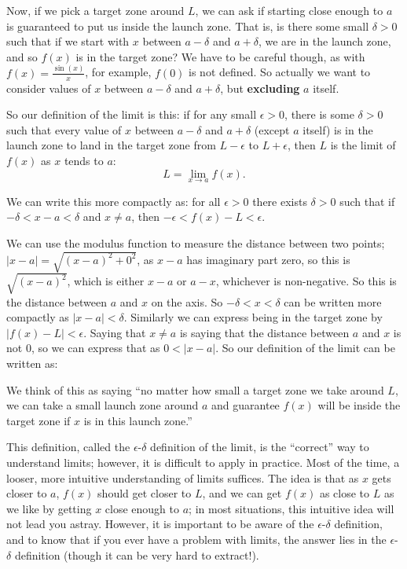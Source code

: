 \documentclass{article}
\begin{document}
Now, if we pick a target zone around $L$, we can ask if starting close enough to $a$ is guaranteed to put us inside the launch zone. That is, is there some small $\delta>0$ such that if we start with $x$ between $a-\delta$ and $a+\delta$, we are in the launch zone, and so $f(x)$ is in the target zone? We have to be careful though, as with $f(x)=\frac{\sin(x)}{x}$, for example, $f(0)$ is not defined. So actually we want to consider values of $x$ between $a-\delta$ and $a+\delta$, but \textbf{excluding} $a$ itself.

So our definition of the limit is this: if for any small $\epsilon>0$, there is some $\delta>0$ such that every value of $x$ between $a-\delta$ and $a+\delta$ (except $a$ itself) is in the launch zone to land in the target zone from $L-\epsilon$ to $L+\epsilon$, then $L$ is the limit of $f(x)$ as $x$ tends to $a$:
\[L=\lim_{x\to a}f(x).\]

We can write this more compactly as: for all $\epsilon>0$ there exists $\delta>0$ such that if $-\delta<x-a<\delta$ and $x\neq a$, then $-\epsilon<f(x)-L<\epsilon$.

We can use the modulus function to measure the distance between two points; $|x-a|=\sqrt{(x-a)^2+0^2}$, as $x-a$ has imaginary part zero, so this is $\sqrt{(x-a)^2}$, which is either $x-a$ or $a-x$, whichever is non-negative. So this is the distance between $a$ and $x$ on the axis. So $-\delta<x<\delta$ can be written more compactly as $|x-a|<\delta$. Similarly we can express being in the target zone by $|f(x)-L|<\epsilon$. Saying that $x\neq a$ is saying that the distance between $a$ and $x$ is not 0, so we can express that as $0<|x-a|$. So our definition of the limit can be written as:\bigskip

\noindent{}\bigskip

We think of this as saying ``no matter how small a target zone we take around $L$, we can take a small launch zone around $a$ and guarantee $f(x)$ will be inside the target zone if $x$ is in this launch zone.''

\vspace{5mm}


This definition, called the $\epsilon$-$\delta$ definition of the limit, is the ``correct'' way to understand limits; however, it is difficult to apply in practice. Most of the time, a looser, more intuitive understanding of limits suffices. The idea is that as $x$ gets closer to $a$, $f(x)$ should get closer to $L$, and we can get $f(x)$ as close to $L$ as we like by getting $x$ close enough to $a$; in most situations, this intuitive idea will not lead you astray. However, it is important to be aware of the $\epsilon$-$\delta$ definition, and to know that if you ever have a problem with limits, the answer lies in the $\epsilon$-$\delta$ definition (though it can be very hard to extract!).
\end{document}

